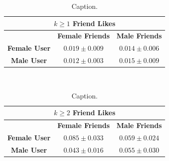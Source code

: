 \begin{table}[t!]
\centering
\begin{tabular}{|c|c|c|} 
\multicolumn{3}{c}{\textbf{$k \geq 1$ Friend Likes}} \\ \hline
& \textbf{Female Friends} & \textbf{Male Friends} \\ \hline
\textbf{Female User} & $0.019 \pm 0.009$ & $0.014 \pm 0.006$ \\ \hline
\textbf{Male User}   & $0.012 \pm 0.003$ & $0.015 \pm 0.009$ \\ \hline
\end{tabular} $\qquad$
\begin{tabular}{|c|c|c|} 
\multicolumn{3}{c}{\textbf{$k \geq 2$ Friend Likes}} \\ \hline
& \textbf{Female Friends} & \textbf{Male Friends} \\ \hline
\textbf{Female User} & $0.085 \pm 0.033$ & $0.059 \pm 0.024$ \\ \hline
\textbf{Male User}   & $0.043 \pm 0.016$ & $0.055 \pm 0.030$ \\ \hline
\end{tabular}
\caption{Caption.}
\label{fig:res4}
\end{table}

